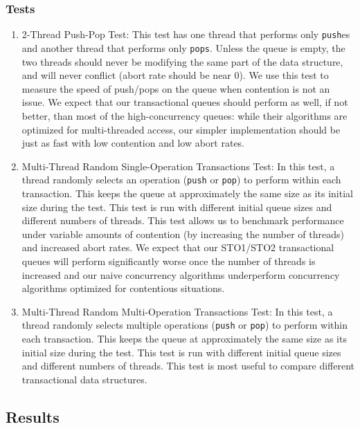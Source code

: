 \subsubsection{Tests}
\begin{enumerate}
\item 2-Thread Push-Pop Test: This test has one thread that performs only \texttt{push}es and another thread that performs only \texttt{pops}. Unless the queue is empty, the two threads should never be modifying the same part of the data structure, and will never conflict (abort rate should be near 0). We use this test to measure the speed of push/pops on the queue when contention is not an issue. We expect that our transactional queues should perform as well, if not better, than most of the high-concurrency queues: while their algorithms are optimized for multi-threaded access, our simpler implementation should be just as fast with low contention and low abort rates.

\item Multi-Thread Random Single-Operation Transactions Test: 
    In this test, a thread randomly selects an operation (\texttt{push} or \texttt{pop}) to perform within each transaction. This keeps the queue at approximately the same size as its initial size during the test. This test is run with different initial queue sizes and different numbers of threads. This test allows us to benchmark performance under variable amounts of contention (by increasing the number of threads) and increased abort rates. We expect that our STO1/STO2 transactional queues will perform significantly worse once the number of threads is increased and our naive concurrency algorithms underperform concurrency algorithms optimized for contentious situations.
    
\item Multi-Thread Random Multi-Operation Transactions Test: 
    In this test, a thread randomly selects multiple operations (\texttt{push} or \texttt{pop}) to perform within each transaction. This keeps the queue at approximately the same size as its initial size during the test. This test is run with different initial queue sizes and different numbers of threads. This test is most useful to compare different transactional data structures.
    
\end{enumerate}

\subsection{Results}

